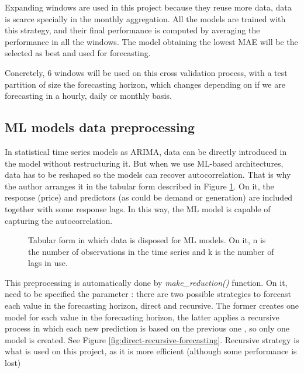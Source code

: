 Expanding windows are used in this project because they reuse more data, data is scarce specially in the monthly aggregation.
All the models are trained with this strategy, and their final performance is computed by averaging the performance in all the windows.
The model obtaining the lowest MAE will be the selected as best and used for forecasting.

Concretely, 6 windows will be used on this cross validation process, with a test partition of size the forecasting horizon, which changes depending on if we are forecasting in a hourly, daily or monthly basis.

\subsection{ML models data preprocessing}
In statistical time series models as ARIMA, data can be directly introduced in the model without restructuring it.
But when we use ML-based architectures, data has to be reshaped so the models can recover autocorrelation.
That is why the author arranges it in the tabular form described in Figure \ref{fig:ml-arrangement}.
On it, the response (price) and predictors (as could be demand or generation) are included together with some response lags.
In this way, the ML model is capable of capturing the autocorrelation.

\begin{figure}[H]
\centering
    \caption{Tabular form in which data is disposed for ML models. On it, n is the number of observations in the time series and k is the number of lags in use.}
    \label{fig:ml-arrangement}
\end{figure}

This preprocessing is automatically done by \textit{make\_reduction()} function.
On it, need to be specified the parameter : there are two possible strategies to forecast each value in the forecasting horizon, direct and recursive.
The former creates one model for each value in the forecasting horizon, the latter applies a recursive process in which each new prediction is based on the previous one \cite{direct-recursive-forecasting}, so only one model is created. See Figure \ref{fig:direct-recursive-forecasting}. Recursive strategy is what is used on this project, as it is more efficient (although some performance is lost)

